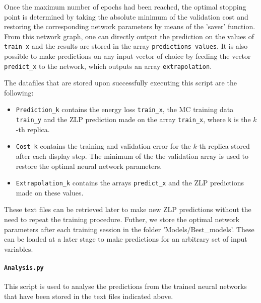 \begin{itemize}
Once the maximum number of epochs 
had been reached, the optimal stopping point is determined by 
taking the absolute minimum of the validation cost
and restoring the corresponding network parameters by means of the 'saver' function.
%
From this network graph, one can directly output the prediction on the values of {\tt train\_x} and
the results are stored in the array {\tt predictions\_values}.
%
It is also possible to make predictions on any input vector of choice by feeding 
the vector {\tt predict\_x} to the 
network, which outputs an array {\tt extrapolation}.

\end{itemize}

The datafiles that are stored upon successfully
executing this script are the following:

\begin{itemize}

\item {\tt Prediction\_k} contains the energy loss {\tt train\_x}, the MC training data {\tt train\_y}
and the ZLP prediction made on the array {\tt train\_x}, where {\tt k} is the $k$-th replica. 
\item {\tt Cost\_k} contains the training and validation error for the
  $k$-th replica
stored after each display step. 
The minimum of the the validation array is used to restore the optimal
neural network parameters.
\item {\tt Extrapolation\_k} contains the arrays {\tt predict\_x} and the ZLP predictions made on these values. 
\end{itemize}
These text files can be retrieved later to make new ZLP predictions
without the need to repeat the training procedure.
%
Futher, we store the optimal network parameters after each training session in the folder
'Models/Best\_models'. 
%
These can be loaded at a later stage
to make predictions for an arbitrary set of input variables. 

\noindent
\paragraph{\tt Analysis.py}
This script is used to analyse the predictions from the trained
neural networks that have been stored in the text files indicated above.

